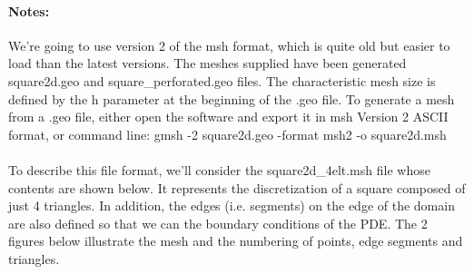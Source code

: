 \documentclass[english,10pt,a4paper]{article}
\begin{document}
\paragraph{Notes:} We're going to use version 2 of the msh format, which is quite old but easier to load than the latest versions. The meshes supplied have been generated
square2d.geo and square\_perforated.geo files. The characteristic mesh size is defined by the h parameter at the beginning of the .geo file.
To generate a mesh from a .geo file, either open the software and export it in msh Version 2 ASCII format, or
command line: gmsh -2 square2d.geo -format msh2 -o square2d.msh

\paragraph{}
To describe this file format, we'll consider the square2d\_4elt.msh file whose contents are shown below.
It represents the discretization of a square composed of just 4 triangles. In addition, the edges (i.e. segments) on the edge of the domain are also defined so that we can
the boundary conditions of the PDE. The 2 figures below illustrate the mesh and the numbering of points, edge segments and triangles.
\end{document}
